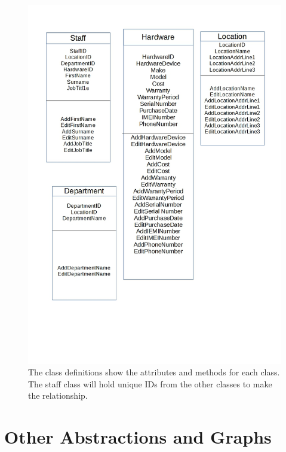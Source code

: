 \begin{figure}[H]
\hspace*{-1.3cm}
\vspace*{-1cm}
\includegraphics[width=1\textwidth]{ClassDefinitions.jpg}
\caption{The class definitions show the attributes and methods for each class. The staff class will hold unique IDs from the other classes to make the relationship.} \label{Class Definitions}
\end{figure}

\section{Other Abstractions and Graphs}

